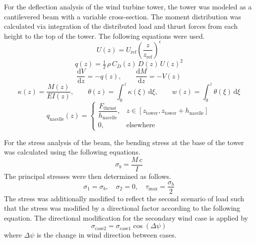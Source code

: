 \documentclass[11pt]{article}
\begin{document}
For the deflection analysis of the wind turbine tower, the tower was modeled as a cantilevered beam with a variable cross-section. The moment distribution was calculated via integration of the distributed load and thrust forces from each height to the top of the tower. The following equations were used.
\begin{equation}
 U(z) = U_{\text{ref}}\left(\frac{z}{z_{\text{ref}}}\right)^{\epsilon}
\label{eq:wind_profile}
\end{equation}
\begin{equation}
 q(z) = \tfrac{1}{2}\,\rho\,C_D(z)\,D(z)\,U(z)^2
\label{eq:distributed_drag}
\end{equation}
\begin{equation}
 \frac{\mathrm{d}V}{\mathrm{d}z} = -q(z), \qquad \frac{\mathrm{d}M}{\mathrm{d}z} = -V(z)
\label{eq:shear_moment}
\end{equation}
\begin{equation}
 \kappa(z) = \frac{M(z)}{E I(z)}, \qquad \theta(z) = \int_0^{z} \kappa(\xi)\,\mathrm{d}\xi, \qquad w(z) = \int_0^{z} \theta(\xi)\,\mathrm{d}\xi
\label{eq:deflection}
\end{equation}
\begin{equation}
 q_{\text{nacelle}}(z) = \begin{cases} \dfrac{F_{\text{thrust}}}{h_{\text{nacelle}}}, & z\in[z_{\text{tower}}, z_{\text{tower}}+h_{\text{nacelle}}] \\ 0, & \text{elsewhere} \end{cases}
\label{eq:nacelle_load}
\end{equation}

For the stress analysis of the beam, the bending stress at the base of the tower was calculated using the following equations.
\begin{equation}
 \sigma_b = \frac{M\,c}{I}
\label{eq:bending_stress}
\end{equation}
The principal stresses were then determined as follows.
\begin{equation}
 \sigma_1 = \sigma_b, \quad \sigma_2 = 0, \quad \tau_{\max} = \frac{\sigma_b}{2}
\label{eq:principal_stresses}
\end{equation}
The stress was additionally modified to reflect the second scenario of load such that the stress was modified by a directional factor according to the following equation.
The directional modification for the secondary wind case is applied by
\begin{equation}
 \sigma_{\text{case2}} = \sigma_{\text{case1}} \cos(\Delta \psi)
\label{eq:direction_factor}
\end{equation}
where \(\Delta\psi\) is the change in wind direction between cases.
\end{document}
